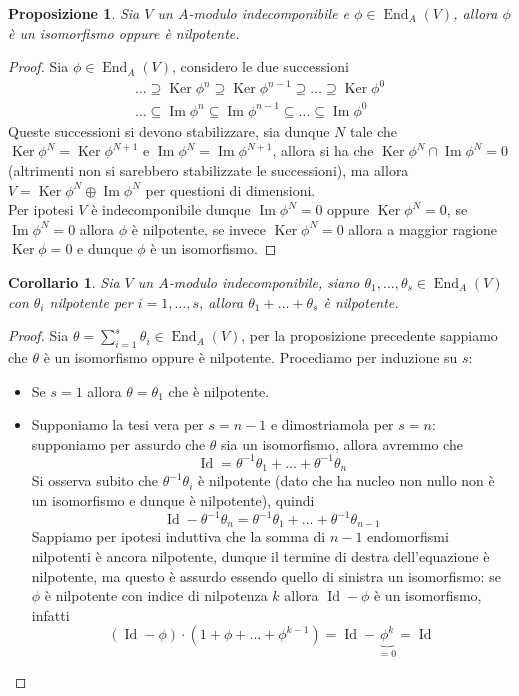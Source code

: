 \documentclass[11pt]{article}
\theoremstyle{plain}
\newtheorem{prop}[thm]{Proposizione}
\newtheorem*{cor}{Corollario}
\theoremstyle{definition}
\theoremstyle{remark}
\DeclareMathOperator{\End}{End}
\DeclareMathOperator{\Ker}{Ker}
\DeclareMathOperator{\Imm}{Im}
\DeclareMathOperator{\Id}{Id}
\begin{document}
	\begin{prop}\label{end_iso_nilp}
		Sia $V$ un $A$-modulo indecomponibile e $\phi\in \End_A(V)$, allora $\phi$ è un isomorfismo oppure è nilpotente.
	\end{prop}
	\begin{proof}
		Sia $\phi\in \End_A(V)$, considero le due successioni
		\begin{gather*}
			\ldots\supseteq \Ker\phi^n\supseteq\Ker\phi^{n-1}\supseteq\ldots\supseteq\Ker\phi^0\\
			\ldots\subseteq\Imm\phi^n\subseteq\Imm\phi^{n-1}\subseteq\ldots\subseteq\Imm\phi^0
		\end{gather*}
		Queste successioni si devono stabilizzare, sia dunque $N$ tale che $\Ker\phi^N=\Ker\phi^{N+1}$ e $\Imm\phi^N=\Imm\phi^{N+1}$, allora si ha che $\Ker\phi^N\cap\Imm\phi^N=0$ (altrimenti non si sarebbero stabilizzate le successioni), ma allora $V=\Ker\phi^N\oplus\Imm\phi^N$ per questioni di dimensioni.\\
		Per ipotesi $V$ è indecomponibile dunque $\Imm\phi^N=0$ oppure $\Ker\phi^N=0$, se $\Imm\phi^N=0$ allora $\phi$ è nilpotente, se invece $\Ker\phi^N=0$ allora a maggior ragione $\Ker \phi=0$ e dunque $\phi$ è un isomorfismo.
	\end{proof}
	\begin{cor}\label{sum_nilp}
		Sia $V$ un $A$-modulo indecomponibile, siano $\theta_1,\ldots,\theta_s\in \End_A(V)$ con $\theta_i$ nilpotente per $i=1,\ldots,s$, allora $\theta_1+\ldots+\theta_s$ è nilpotente.
	\end{cor}
	\begin{proof}
		Sia $\displaystyle \theta=\sum_{i=1}^{s}\theta_i\in \End_A(V)$, per la proposizione precedente sappiamo che $\theta$ è un isomorfismo oppure è nilpotente. Procediamo per induzione su $s$:
		\begin{itemize}
			\item Se $s=1$ allora $\theta=\theta_1$ che è nilpotente.
			\item Supponiamo la tesi vera per $s=n-1$ e dimostriamola per $s=n$: supponiamo per assurdo che $\theta$ sia un isomorfismo, allora avremmo che
			\[
				\Id = \theta^{-1}\theta_1+\ldots+\theta^{-1}\theta_n
			\]
			Si osserva subito che $\theta^{-1}\theta_i$ è nilpotente (dato che ha nucleo non nullo non è un isomorfismo e dunque è nilpotente), quindi
			\[
				\Id-\theta^{-1}\theta_n = \theta^{-1}\theta_1+\ldots+\theta^{-1}\theta_{n-1}
			\]
			Sappiamo per ipotesi induttiva che la somma di $n-1$ endomorfismi nilpotenti è ancora nilpotente, dunque il termine di destra dell'equazione è nilpotente, ma questo è assurdo essendo quello di sinistra un isomorfismo: se $\phi$ è nilpotente con indice di nilpotenza $k$ allora $\Id-\phi$ è un isomorfismo, infatti
			\[
				(\Id-\phi)\cdot(1+\phi+\ldots+\phi^{k-1}) = \Id-\underbrace{\phi^k}_{=0} = \Id
			\]
		\end{itemize}
	\end{proof}
\end{document}
